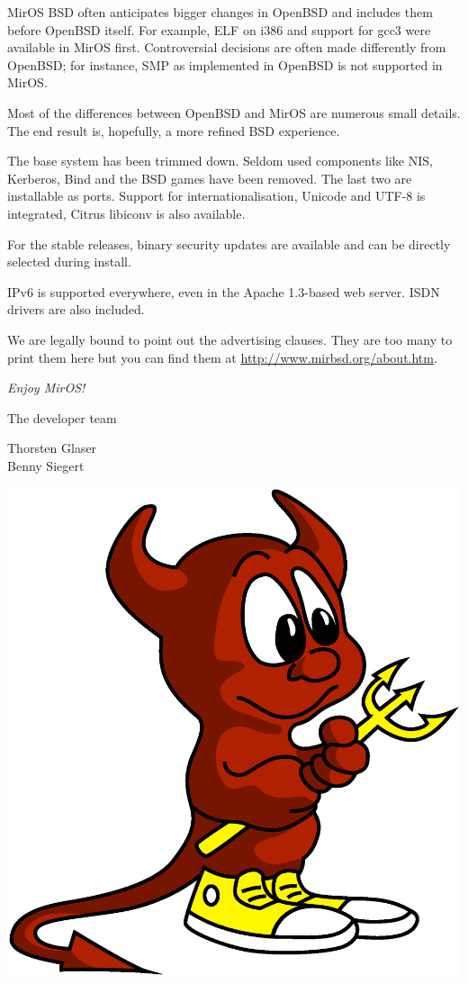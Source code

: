 \documentclass[a4paper,landscape,11pt,notumble]{leaflet}
\begin{document}
MirOS BSD often anticipates bigger changes in OpenBSD and includes them before OpenBSD itself. For example, ELF on i386 and support for gcc3 were available in MirOS first. Controversial decisions are often made differently from OpenBSD; for instance, SMP as implemented in OpenBSD is not supported in MirOS.

Most of the differences between OpenBSD and MirOS are numerous small details. The end result is, hopefully, a more refined BSD experience.

The base system has been trimmed down. Seldom used components like NIS, Kerberos, Bind and the BSD games have been removed. The last two are installable as ports. Support for internationalisation, Unicode and UTF-8 is integrated, Citrus libiconv is also available.

For the stable releases, binary security updates are available and can be directly selected during install.

IPv6 is supported everywhere, even in the Apache 1.3-based web server. ISDN drivers are also included.

We are legally bound to point out the advertising clauses. They are too many to print them here but you can find them at \url{http://www.mirbsd.org/about.htm}.

\newpage


\graybox\par
\begin{center}
\vspace{3ex}
{\Large\itshape
Enjoy MirOS!\par\medskip
The developer team\par\medskip
\color{darkred}%
Thorsten Glaser\\
Benny Siegert\par
}

\vfill

\includegraphics[width=0.75\columnwidth]{img/bsdaemon}

\vfill%
\end{center}%
\end{document}

